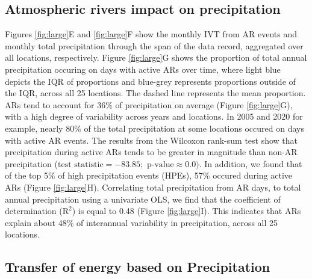 \documentclass[12pts,draft]{AR_analysis_}
\begin{document}
\subsection{Atmospheric rivers impact on precipitation}

Figures \ref{fig:large}E and \ref{fig:large}F show the monthly IVT from 
AR events and monthly total precipitation through the span of the 
data record, aggregated over all locations, respectively. Figure \ref{fig:large}G
shows the proportion of total annual precipitation occuring on days with
active ARs over time, where 
light blue depicts the IQR of proportions and blue-grey represents 
proportions outside of the IQR, across all 25 locations. The dashed line 
represents the mean proportion.
ARs tend to account for 36\% of
precipitation on average (Figure \ref{fig:large}G), 
with a high degree of variability across
years and locations. In 2005 and 2020 for example, nearly 
80\% of the total precipitation at some locations occured on days with
active AR events. The results 
from the Wilcoxon rank-sum test show that
precipitation during active ARs tends to be greater in magnitude than non-AR 
precipitation
($\text{test statistic} = -83.85; \text{ p-value} \approx 0.0)$. In addition,
we found that of the top 5\% of high precipitation events (HPEs), 57\%
occured during active ARs (Figure \ref{fig:large}H).
Correlating total precipitation from AR days, to total annual
precipitation using a univariate OLS, we find that the
coefficient of determination ($\mathrm{R^{2}}$) is equal to 0.48 (Figure 
\ref{fig:large}I). This indicates that ARs
explain about 48\% of interannual variability in precipitation, 
across all 25 locations.  


\subsection{Transfer of energy based on Precipitation}
\end{document}
